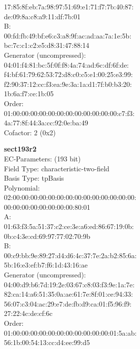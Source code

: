    17:85:8f:eb:7a:98:97:51:69:e1:71:f7:7b:40:87:\\
    de:09:8a:c8:a9:11:df:7b:01\\
B:   \\
    00:fd:fb:49:bf:e6:c3:a8:9f:ac:ad:aa:7a:1e:5b:\\
    bc:7c:c1:c2:e5:d8:31:47:88:14\\
Generator (uncompressed):\\
    04:01:f4:81:bc:5f:0f:f8:4a:74:ad:6c:df:6f:de:\\
    f4:bf:61:79:62:53:72:d8:c0:c5:e1:00:25:e3:99:\\
    f2:90:37:12:cc:f3:ea:9e:3a:1a:d1:7f:b0:b3:20:\\
    1b:6a:f7:ce:1b:05\\
Order: \\
    01:00:00:00:00:00:00:00:00:00:00:00:00:c7:f3:\\
    4a:77:8f:44:3a:cc:92:0e:ba:49\\
Cofactor:  2 (0x2)\\
\item \textbf{ sect193r2 }\\
EC-Parameters: (193 bit)\\
Field Type: characteristic-two-field\\
Basis Type: tpBasis\\
Polynomial:\\
    02:00:00:00:00:00:00:00:00:00:00:00:00:00:00:\\
    00:00:00:00:00:00:00:00:80:01\\
A:   \\
    01:63:f3:5a:51:37:c2:ce:3e:a6:ed:86:67:19:0b:\\
    0b:c4:3e:cd:69:97:77:02:70:9b\\
B:   \\
    00:c9:bb:9e:89:27:d4:d6:4c:37:7e:2a:b2:85:6a:\\
    5b:16:e3:ef:b7:f6:1d:43:16:ae\\
Generator (uncompressed):\\
    04:00:d9:b6:7d:19:2e:03:67:c8:03:f3:9e:1a:7e:\\
    82:ca:14:a6:51:35:0a:ae:61:7e:8f:01:ce:94:33:\\
    56:07:c3:04:ac:29:e7:de:fb:d9:ca:01:f5:96:f9:\\
    27:22:4c:de:cf:6c\\
Order: \\
    01:00:00:00:00:00:00:00:00:00:00:00:01:5a:ab:\\
    56:1b:00:54:13:cc:d4:ee:99:d5\\
